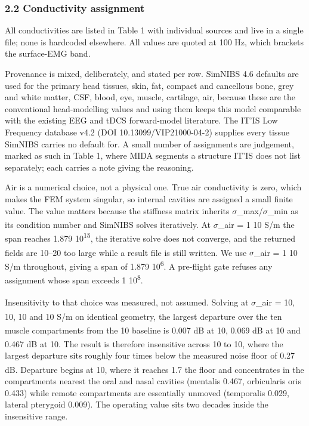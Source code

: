 \documentclass[
  11pt,
  a4paper,
]{article}
\newcounter{none} %
\begin{document}
\subsubsection{2.2 Conductivity assignment}\label{conductivity-assignment}

All conductivities are listed in Table 1 with individual sources and live in a
single file; none is hardcoded elsewhere. All values are quoted at 100 Hz, which
brackets the surface-EMG band.

Provenance is mixed, deliberately, and stated per row. SimNIBS 4.6 defaults are
used for the primary head tissues, skin, fat, compact and cancellous bone, grey
and white matter, CSF, blood, eye, muscle, cartilage, air, because these are
the conventional head-modelling values and using them keeps this model
comparable with the existing EEG and tDCS forward-model literature. The IT'IS
Low Frequency database v4.2 (DOI 10.13099/VIP21000-04-2) supplies every tissue
SimNIBS carries no default for. A small number of assignments are judgement,
marked as such in Table 1, where MIDA segments a structure IT'IS does not list
separately; each carries a note giving the reasoning.

Air is a numerical choice, not a physical one. True air conductivity is
zero, which makes the FEM system singular, so internal cavities are assigned a
small finite value. The value matters because the stiffness matrix inherits
$\sigma$\_max/$\sigma$\_min as its condition number and SimNIBS solves iteratively. At
$\sigma$\_air = 1 \texttimes{} 10\textsuperscript{} S/m the span reaches 1.879 \texttimes{} 10\textsuperscript{15}, the iterative solve does
not converge, and the returned fields are 10--20\texttimes{} too large while a result file
is still written. We use $\sigma$\_air = 1 \texttimes{} 10\textsuperscript{} S/m throughout, giving a span of
1.879 \texttimes{} 10\textsuperscript{6}. A pre-flight gate refuses any assignment whose span exceeds
1 \texttimes{} 10\textsuperscript{8}.

Insensitivity to that choice was measured, not assumed. Solving at
$\sigma$\_air = 10\textsuperscript{}, 10\textsuperscript{}, 10\textsuperscript{} and 10\textsuperscript{} S/m on identical geometry, the largest
departure over the ten muscle compartments from the 10\textsuperscript{} baseline is 0.007 dB at
10\textsuperscript{}, 0.069 dB at 10\textsuperscript{} and 0.467 dB at 10\textsuperscript{}. The result is therefore
insensitive across 10\textsuperscript{} to 10\textsuperscript{}, where the largest departure sits roughly four
times below the measured noise floor of 0.27 dB. Departure begins at 10\textsuperscript{}, where
it reaches 1.7\texttimes{} the floor and concentrates in the compartments nearest the oral
and nasal cavities (mentalis \textminus{}0.467, orbicularis oris \textminus{}0.433) while remote
compartments are essentially unmoved (temporalis \textminus{}0.029, lateral pterygoid
\textminus{}0.009). The operating value sits two decades inside the insensitive range.
\end{document}
